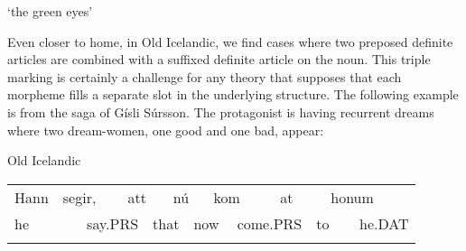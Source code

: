 \begin{styleTranslation}
‘the green eyes’

\end{styleTranslation}

\begin{styleBodyTextFirst}
Even closer to home, in Old Icelandic, we find cases where two preposed definite articles are combined with a suffixed definite article on the noun. This triple marking is certainly a challenge for any theory that supposes that each morpheme fills a separate slot in the underlying structure. The following example is from the saga of Gísli Súrsson. The protagonist is having recurrent dreams where two dream-women, one good and one bad, appear: 

\end{styleBodyTextFirst}


\begin{listWWNumileveli}
\item {}

\begin{styleExample}
Old Icelandic

\end{styleExample}

\end{listWWNumileveli}

\begin{tabular}{llllllllllllll}
\lsptoprule
Hann & \multicolumn{2}{l}{segir,

} & \multicolumn{2}{l}{att

} & \multicolumn{2}{l}{nú

} & \multicolumn{2}{l}{kom

} & \multicolumn{2}{l}{at

} & \multicolumn{2}{l}{honum

} & \\
\multicolumn{2}{l}{he

} & \multicolumn{2}{l}{say.PRS 

} & \multicolumn{2}{l}{that

} & \multicolumn{2}{l}{now

} & \multicolumn{2}{l}{come.PRS

} & \multicolumn{2}{l}{to

} & \multicolumn{2}{l}{he.DAT

}\\
\lspbottomrule
\end{tabular}

